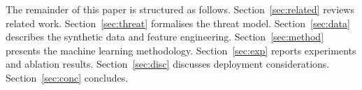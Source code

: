 The remainder of this paper is structured as follows.
Section~\ref{sec:related} reviews related work.
Section~\ref{sec:threat} formalises the threat model.
Section~\ref{sec:data} describes the synthetic data and feature engineering.
Section~\ref{sec:method} presents the machine learning methodology.
Section~\ref{sec:exp} reports experiments and ablation results.
Section~\ref{sec:disc} discusses deployment considerations.
Section~\ref{sec:conc} concludes.
